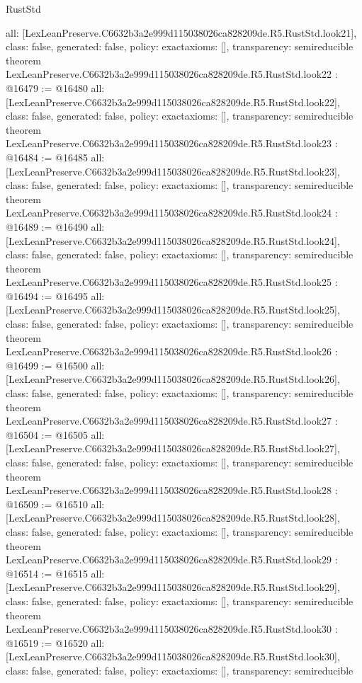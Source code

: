 \begin{lexlean}{RustStd}
\begin{coremodule}
{  all: [LexLeanPreserve.C6632b3a2e999d115038026ca828209de.R5.RustStd.look21],
  class: false,
  generated: false,
  policy: exact{axioms: []},
  transparency: semireducible
}
theorem LexLeanPreserve.C6632b3a2e999d115038026ca828209de.R5.RustStd.look22 : @16479 := @16480 {
  all: [LexLeanPreserve.C6632b3a2e999d115038026ca828209de.R5.RustStd.look22],
  class: false,
  generated: false,
  policy: exact{axioms: []},
  transparency: semireducible
}
theorem LexLeanPreserve.C6632b3a2e999d115038026ca828209de.R5.RustStd.look23 : @16484 := @16485 {
  all: [LexLeanPreserve.C6632b3a2e999d115038026ca828209de.R5.RustStd.look23],
  class: false,
  generated: false,
  policy: exact{axioms: []},
  transparency: semireducible
}
theorem LexLeanPreserve.C6632b3a2e999d115038026ca828209de.R5.RustStd.look24 : @16489 := @16490 {
  all: [LexLeanPreserve.C6632b3a2e999d115038026ca828209de.R5.RustStd.look24],
  class: false,
  generated: false,
  policy: exact{axioms: []},
  transparency: semireducible
}
theorem LexLeanPreserve.C6632b3a2e999d115038026ca828209de.R5.RustStd.look25 : @16494 := @16495 {
  all: [LexLeanPreserve.C6632b3a2e999d115038026ca828209de.R5.RustStd.look25],
  class: false,
  generated: false,
  policy: exact{axioms: []},
  transparency: semireducible
}
theorem LexLeanPreserve.C6632b3a2e999d115038026ca828209de.R5.RustStd.look26 : @16499 := @16500 {
  all: [LexLeanPreserve.C6632b3a2e999d115038026ca828209de.R5.RustStd.look26],
  class: false,
  generated: false,
  policy: exact{axioms: []},
  transparency: semireducible
}
theorem LexLeanPreserve.C6632b3a2e999d115038026ca828209de.R5.RustStd.look27 : @16504 := @16505 {
  all: [LexLeanPreserve.C6632b3a2e999d115038026ca828209de.R5.RustStd.look27],
  class: false,
  generated: false,
  policy: exact{axioms: []},
  transparency: semireducible
}
theorem LexLeanPreserve.C6632b3a2e999d115038026ca828209de.R5.RustStd.look28 : @16509 := @16510 {
  all: [LexLeanPreserve.C6632b3a2e999d115038026ca828209de.R5.RustStd.look28],
  class: false,
  generated: false,
  policy: exact{axioms: []},
  transparency: semireducible
}
theorem LexLeanPreserve.C6632b3a2e999d115038026ca828209de.R5.RustStd.look29 : @16514 := @16515 {
  all: [LexLeanPreserve.C6632b3a2e999d115038026ca828209de.R5.RustStd.look29],
  class: false,
  generated: false,
  policy: exact{axioms: []},
  transparency: semireducible
}
theorem LexLeanPreserve.C6632b3a2e999d115038026ca828209de.R5.RustStd.look30 : @16519 := @16520 {
  all: [LexLeanPreserve.C6632b3a2e999d115038026ca828209de.R5.RustStd.look30],
  class: false,
  generated: false,
  policy: exact{axioms: []},
  transparency: semireducible
}
\end{coremodule}
\end{lexlean}
